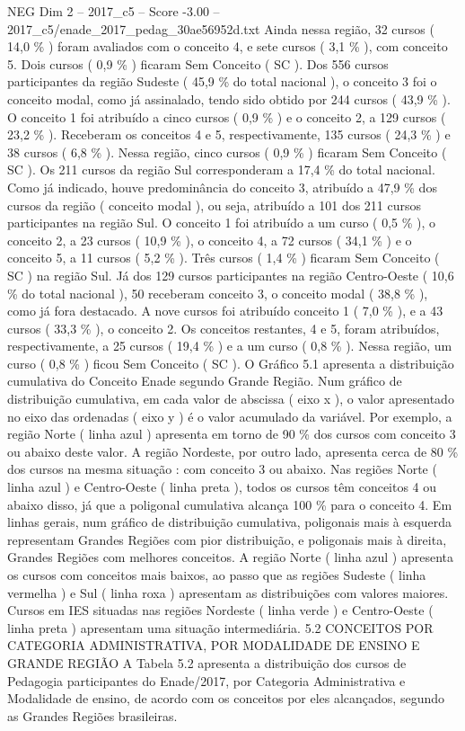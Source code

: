 \begin{textsample}{NEG Dim 2 – 2017\_c5 – Score -3.00 – 2017\_c5/enade\_2017\_pedag\_30ae56952d.txt}
Ainda nessa região, 32 cursos ( 14,0 \% ) foram avaliados com o conceito 4, e sete cursos ( 3,1 \% ), com conceito 5.
Dois cursos ( 0,9 \% ) ficaram Sem Conceito ( SC ).
Dos 556 cursos participantes da região Sudeste ( 45,9 \% do total nacional ), o conceito 3 foi o conceito modal, como já assinalado, tendo sido obtido por 244 cursos ( 43,9 \% ).
O conceito 1 foi atribuído a cinco cursos ( 0,9 \% ) e o conceito 2, a 129 cursos ( 23,2 \% ).
Receberam os conceitos 4 e 5, respectivamente, 135 cursos ( 24,3 \% ) e 38 cursos ( 6,8 \% ).
Nessa região, cinco cursos ( 0,9 \% ) ficaram Sem Conceito ( SC ).
Os 211 cursos da região Sul corresponderam a 17,4 \% do total nacional.
Como já indicado, houve predominância do conceito 3, atribuído a 47,9 \% dos cursos da região ( conceito modal ), ou seja, atribuído a 101 dos 211 cursos participantes na região Sul.
O conceito 1 foi atribuído a um curso ( 0,5 \% ), o conceito 2, a 23 cursos ( 10,9 \% ), o conceito 4, a 72 cursos ( 34,1 \% ) e o conceito 5, a 11 cursos ( 5,2 \% ).
Três cursos ( 1,4 \% ) ficaram Sem Conceito ( SC ) na região Sul.
Já dos 129 cursos participantes na região Centro-Oeste ( 10,6 \% do total nacional ), 50 receberam conceito 3, o conceito modal ( 38,8 \% ), como já fora destacado.
A nove cursos foi atribuído conceito 1 ( 7,0 \% ), e a 43 cursos ( 33,3 \% ), o conceito 2.
Os conceitos restantes, 4 e 5, foram atribuídos, respectivamente, a 25 cursos ( 19,4 \% ) e a um curso ( 0,8 \% ).
Nessa região, um curso ( 0,8 \% ) ficou Sem Conceito ( SC ).
O Gráfico 5.1 apresenta a distribuição cumulativa do Conceito Enade segundo Grande Região.
Num gráfico de distribuição cumulativa, em cada valor de abscissa ( eixo x ), o valor apresentado no eixo das ordenadas ( eixo y ) é o valor acumulado da variável.
Por exemplo, a região Norte ( linha azul ) apresenta em torno de 90 \% dos cursos com conceito 3 ou abaixo deste valor.
A região Nordeste, por outro lado, apresenta cerca de 80 \% dos cursos na mesma situação : com conceito 3 ou abaixo.
Nas regiões Norte ( linha azul ) e Centro-Oeste ( linha preta ), todos os cursos têm conceitos 4 ou abaixo disso, já que a poligonal cumulativa alcança 100 \% para o conceito 4.
Em linhas gerais, num gráfico de distribuição cumulativa, poligonais mais à esquerda representam Grandes Regiões com pior distribuição, e poligonais mais à direita, Grandes Regiões com melhores conceitos.
A região Norte ( linha azul ) apresenta os cursos com conceitos mais baixos, ao passo que as regiões Sudeste ( linha vermelha ) e Sul ( linha roxa ) apresentam as distribuições com valores maiores.
Cursos em IES situadas nas regiões Nordeste ( linha verde ) e Centro-Oeste ( linha preta ) apresentam uma situação intermediária. 5.2 CONCEITOS POR CATEGORIA ADMINISTRATIVA, POR MODALIDADE DE ENSINO E GRANDE REGIÃO A Tabela 5.2 apresenta a distribuição dos cursos de Pedagogia participantes do Enade/2017, por Categoria Administrativa e Modalidade de ensino, de acordo com os conceitos por eles alcançados, segundo as Grandes Regiões brasileiras.

\end{textsample}
